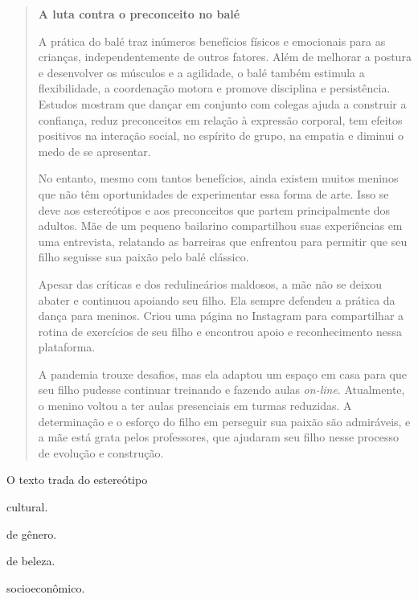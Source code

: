 \begin{quote}
\textbf{A luta contra o preconceito no balé}

A prática do balé traz inúmeros benefícios físicos e emocionais para as crianças, independentemente de 
outros fatores. Além de melhorar a postura e desenvolver os músculos e a agilidade, o balé também estimula 
a flexibilidade, a coordenação motora e promove disciplina e persistência. Estudos mostram que dançar em 
conjunto com colegas ajuda a construir a confiança, reduz preconceitos em relação à expressão corporal, tem 
efeitos positivos na interação social, no espírito de grupo, na empatia e diminui o medo de se apresentar.

No entanto, mesmo com tantos benefícios, ainda existem muitos meninos que não têm oportunidades de 
experimentar essa forma de arte. Isso se deve aos estereótipos e aos preconceitos que partem principalmente 
dos adultos. Mãe de um pequeno bailarino compartilhou suas experiências em uma entrevista, relatando as 
barreiras que enfrentou para permitir que seu filho seguisse sua paixão pelo balé clássico.

Apesar das críticas e dos redulineários maldosos, a mãe não se deixou abater e continuou apoiando seu filho. 
Ela sempre defendeu a prática da dança para meninos. Criou uma página no Instagram para compartilhar a rotina de exercícios de seu filho e encontrou apoio e reconhecimento nessa plataforma.

A pandemia trouxe desafios, mas ela adaptou um espaço em casa para que seu filho pudesse continuar 
treinando e fazendo aulas \textit{on-line}. Atualmente, o menino voltou a ter aulas presenciais em turmas 
reduzidas. A determinação e o esforço do filho em perseguir sua paixão são admiráveis, e a mãe está grata pelos professores, que ajudaram seu filho nesse processo de evolução e construção.

\end{quote}

O texto trada do estereótipo

\begin{escolha}
\item
  cultural.
\item
  de gênero.
\item
  de beleza.
\item
  socioeconômico.
\end{escolha}

